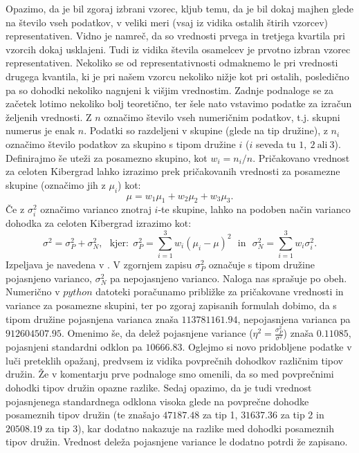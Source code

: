 \documentclass{article}
\begin{document}
Opazimo, da je bil zgoraj izbrani vzorec, kljub temu, da je bil dokaj majhen glede na število vseh podatkov, v veliki meri (vsaj iz vidika ostalih štirih vzorcev) representativen.
Vidno je namreč, da so vrednosti prvega in tretjega kvartila pri vzorcih dokaj usklajeni. 
Tudi iz vidika števila osamelcev je prvotno izbran vzorec representativen. 
Nekoliko se od representativnosti odmaknemo le pri vrednosti drugega kvantila, ki je pri našem vzorcu nekoliko nižje kot pri ostalih, posledično pa so dohodki nekoliko nagnjeni k višjim vrednostim.
\newline
\newline
Zadnje podnaloge se za začetek lotimo nekoliko bolj teoretično, ter šele nato vstavimo podatke za izračun željenih vrednosti. 
Z $n$ označimo število vseh numeričnim podatkov, t.j. skupni numerus je enak $n$. Podatki so razdeljeni v skupine (glede na tip družine), z $n_i$ označimo število podatkov za skupino s tipom družine $i$ ($i$ seveda tu $1,~2~\text{ali}~3$).
Definirajmo še uteži za posamezno skupino, kot $w_i = n_i/n$.
\newline
Pričakovano vrednost za celoten Kibergrad lahko izrazimo prek pričakovanih vrednosti za posamezne skupine (označimo jih z $\mu_i$) kot:
$$
    \mu = w_1 \mu_1 + w_2 \mu_2 + w_3 \mu_3.
$$
Če z $\sigma_{i}^2$ označimo varianco znotraj $i$-te skupine, lahko na podoben način varianco dohodka za celoten Kibergrad izrazimo kot:
$$
\sigma^2 = \sigma_{P}^2 + \sigma_{N}^2,~~~\text{kjer:}~~\sigma_{P}^2 = \sum_{i=1}^{3}{w_i(\mu_i - \mu)^2}~~~\text{in}~~~\sigma_{N}^2 = \sum_{i=1}^{3}{w_i \sigma_{i}^2}.
$$
Izpeljava je navedena v \cite{poj_nepo_var}. V zgornjem zapisu $\sigma_P^2$ označuje s tipom družine pojasnjeno varianco, $\sigma_N^2$ pa nepojasnjeno varianco. Naloga nas sprašuje po obeh. 
\newline
Numerično v $python$ datoteki poračunamo približke za pričakovane vrednosti in variance za posamezne skupini, ter po zgoraj zapisanih formulah dobimo, 
da s tipom družine pojasnjena varianca znaša $113781161.94$, nepojasnjena varianca pa $912604507.95$. Omenimo še, da delež pojasnjene variance ($\eta^2 = \frac{\sigma_{P}^2}{\sigma^2}$) znaša $0.11085$, pojasnjeni standardni odklon pa $10666.83$.
\newline
\newline
Oglejmo si novo pridobljene podatke v luči preteklih opažanj, predvsem iz vidika povprečnih dohodkov različnim tipov družin. Že v komentarju prve podnaloge smo omenili, da so med povprečnimi dohodki tipov družin opazne razlike.  
Sedaj opazimo, da je tudi vrednost pojasnjenega standardnega odklona visoka glede na povprečne dohodke posameznih tipov družin (te znašajo $47187.48$ za tip 1, $31637.36$ za tip 2 in $20508.19$ za tip 3), kar dodatno nakazuje na razlike med dohodki posameznih tipov družin.
Vrednost deleža pojasnjene variance le dodatno potrdi že zapisano.
\end{document}
